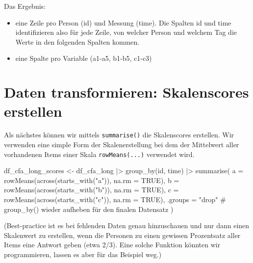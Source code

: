 \documentclass[
  letterpaper,
  DIV=11,
  numbers=noendperiod]{scrreprt}
\newenvironment{Shaded}{\begin{snugshade}}{\end{snugshade}}
\newcommand{\AttributeTok}[1]{\textcolor[rgb]{0.40,0.45,0.13}{#1}}
\newcommand{\CommentTok}[1]{\textcolor[rgb]{0.37,0.37,0.37}{#1}}
\newcommand{\ConstantTok}[1]{\textcolor[rgb]{0.56,0.35,0.01}{#1}}
\newcommand{\FunctionTok}[1]{\textcolor[rgb]{0.28,0.35,0.67}{#1}}
\newcommand{\NormalTok}[1]{\textcolor[rgb]{0.00,0.23,0.31}{#1}}
\newcommand{\OtherTok}[1]{\textcolor[rgb]{0.00,0.23,0.31}{#1}}
\newcommand{\SpecialCharTok}[1]{\textcolor[rgb]{0.37,0.37,0.37}{#1}}
\newcommand{\StringTok}[1]{\textcolor[rgb]{0.13,0.47,0.30}{#1}}
\providecommand{\tightlist}{%
  \setlength{\itemsep}{0pt}\setlength{\parskip}{0pt}}\usepackage{longtable,booktabs,array}
\begin{document}
Das Ergebnis:

\begin{itemize}
\tightlist
\item
  eine Zeile pro Person (id) und Messung (time). Die Spalten id und time
  identifizieren also für jede Zeile, von welcher Person und welchem Tag
  die Werte in den folgenden Spalten kommen.
\item
  eine Spalte pro Variable (a1-a5, b1-b5, c1-c3)
\end{itemize}

\section{Daten transformieren: Skalenscores
erstellen}\label{daten-transformieren-skalenscores-erstellen}

Als nächstes können wir mittels \texttt{summarise()} die Skalenscores
erstellen. Wir verwenden eine simple Form der Skalenerstellung bei dem
der Mittelwert aller vorhandenen Items einer Skala
\texttt{rowMeans(...)} verwendet wird.

\begin{Shaded}
\begin{Highlighting}[]
\NormalTok{df\_cfa\_long\_scores }\OtherTok{\textless{}{-}}\NormalTok{ df\_cfa\_long }\SpecialCharTok{|\textgreater{}} \FunctionTok{group\_by}\NormalTok{(id, time) }\SpecialCharTok{|\textgreater{}} 
  \FunctionTok{summarise}\NormalTok{(}
    \AttributeTok{a =} \FunctionTok{rowMeans}\NormalTok{(}\FunctionTok{across}\NormalTok{(}\FunctionTok{starts\_with}\NormalTok{(}\StringTok{"a"}\NormalTok{)), }\AttributeTok{na.rm =} \ConstantTok{TRUE}\NormalTok{),}
    \AttributeTok{b =} \FunctionTok{rowMeans}\NormalTok{(}\FunctionTok{across}\NormalTok{(}\FunctionTok{starts\_with}\NormalTok{(}\StringTok{"b"}\NormalTok{)), }\AttributeTok{na.rm =} \ConstantTok{TRUE}\NormalTok{),}
    \AttributeTok{c =} \FunctionTok{rowMeans}\NormalTok{(}\FunctionTok{across}\NormalTok{(}\FunctionTok{starts\_with}\NormalTok{(}\StringTok{"c"}\NormalTok{)), }\AttributeTok{na.rm =} \ConstantTok{TRUE}\NormalTok{),}
    \AttributeTok{.groups =} \StringTok{"drop"} \CommentTok{\# group\_by() wieder aufheben für den finalen Datensatz}
\NormalTok{  )}
\end{Highlighting}
\end{Shaded}

(Best-practice ist es bei fehlenden Daten genau hinzuschauen und nur
dann einen Skalenwert zu erstellen, wenn die Personen zu einen gewissen
Prozentsatz aller Items eine Antwort geben (etwa 2/3). Eine solche
Funktion könnten wir programmieren, lassen es aber für das Beispiel
weg.)
\end{document}
